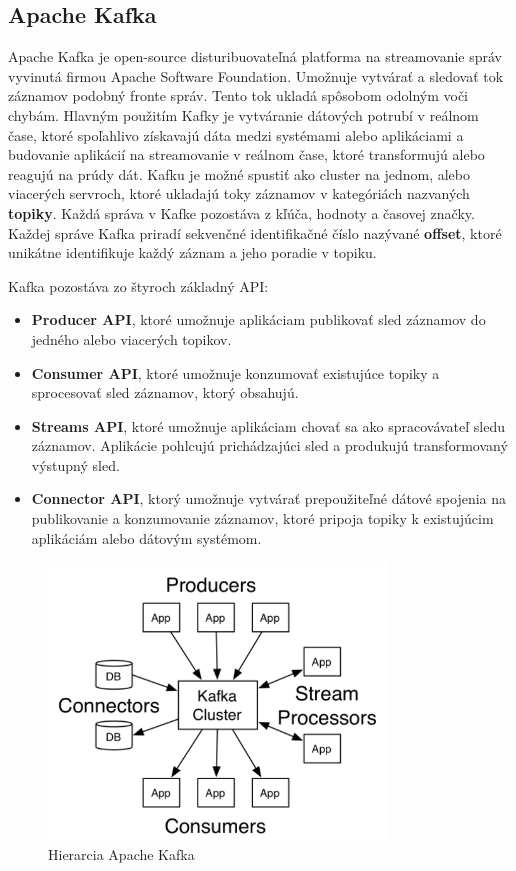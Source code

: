 \subsection{Apache Kafka}
Apache Kafka je open-source disturibuovateľná platforma na streamovanie správ vyvinutá firmou Apache Software Foundation. Umožnuje vytvárať a sledovať tok záznamov podobný fronte správ. Tento tok ukladá spôsobom odolným voči chybám. Hlavným použitím Kafky je vytváranie dátových potrubí v reálnom čase, ktoré spoľahlivo získavajú dáta medzi systémami alebo aplikáciami a budovanie aplikácií na streamovanie v reálnom čase, ktoré transformujú alebo reagujú na prúdy dát. Kafku je možné spustiť ako cluster na jednom, alebo viacerých servroch, ktoré ukladajú toky záznamov v kategóriách nazvaných \textbf{topiky}. Každá správa v Kafke pozostáva z kľúča, hodnoty a časovej značky. Každej správe Kafka priradí sekvenčné identifikačné číslo nazývané \textbf{offset}, ktoré unikátne identifikuje každý záznam a jeho poradie v topiku.

Kafka pozostáva zo štyroch základný API:\cite{Kafka}
\begin{itemize}
\item \textbf{Producer API}, ktoré umožnuje aplikáciam publikovať sled záznamov do jedného alebo viacerých topikov.
\item \textbf{Consumer API}, ktoré umožnuje konzumovať existujúce topiky a sprocesovať sled záznamov, ktorý obsahujú.
\item \textbf{Streams API}, ktoré umožnuje aplikáciam chovať sa ako spracovávateľ sledu záznamov. Aplikácie pohlcujú prichádzajúci sled a produkujú transformovaný výstupný sled.
\item \textbf{Connector API}, ktorý umožnuje vytvárať prepoužiteľné dátové spojenia na publikovanie a konzumovanie záznamov, ktoré pripoja topiky k existujúcim aplikáciám alebo dátovým systémom.
\end{itemize}

\begin{figure}[H]
\begin{center}
\includegraphics[width=9cm]{figures/kafka_hierarchy.PNG}
\caption{Hierarcia Apache Kafka}
\label{fig:kafka_hierarchy}
\end{center}
\end{figure}

